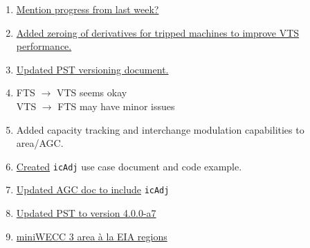 \documentclass[12pt]{article}
\begin{document}
\begin{multicols}{2}
\begin{comment}
\end{comment}
	\begin{enumerate}
	\item \href{https://github.com/thadhaines/MT-Tech-SETO/blob/master/researchDocs/TEX/weekly/200819/weekly_200819.pdf}{Mention progress from last week?}
		
		\item \href{https://github.com/thadhaines/MT-Tech-SETO/blob/master/researchDocs/TEX/one-offs/200820-AGCminiWECCgenTrips2/200820-AGCminiWECCgenTrips2.pdf}{Added zeroing of derivatives for tripped machines to improve VTS performance.}
		
		\item \href{https://github.com/thadhaines/MT-Tech-SETO/blob/master/researchDocs/TEX/one-offs/00-PST-Versioning/00-PST-Versioning.pdf}{Updated PST versioning document.}
		
		\item FTS $\longrightarrow$ VTS seems okay\\
		 VTS $\longrightarrow$ FTS may have minor issues
		\item Added capacity tracking and interchange modulation capabilities to area/AGC.
		
		\item \href{https://github.com/thadhaines/MT-Tech-SETO/blob/master/researchDocs/TEX/one-offs/200821-AGCicAdjTest/200821-AGCicAdjTest.pdf}{Created} \verb|icAdj| use case document and code example.
		
		\item \href{https://github.com/thadhaines/MT-Tech-SETO/blob/master/researchDocs/TEX/one-offs/200720-PSTandAGC/200720-PSTandAGC.pdf}{Updated AGC doc to include} \verb|icAdj|
		
		\item \href{https://github.com/thadhaines/MT-Tech-SETO/tree/master/PST/PSTv4}{Updated PST to version 4.0.0-a7}
		
		\item \href{https://github.com/thadhaines/MT-Tech-SETO/blob/master/researchDocs/pdn/miniWECCsplit/miniWECC_split03.png}{miniWECC 3 area \`{a} la EIA regions}
		


\end{enumerate}
\end{multicols}
\end{document}
